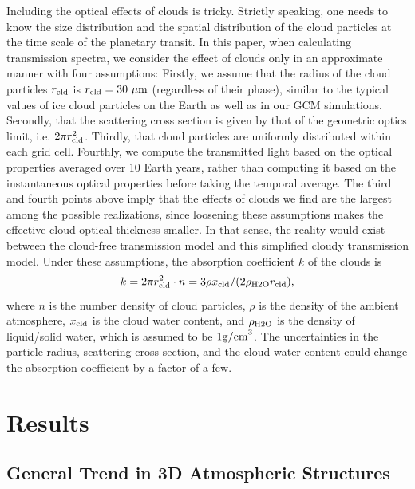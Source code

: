 \documentclass[11pt,numberedappendix,twocolappendix,]{emulateapj}
\begin{document}
Including the optical effects of clouds is tricky. 
Strictly speaking, one needs to know the size distribution and the spatial distribution of the cloud particles at the time scale of the planetary transit. 
In this paper, when calculating transmission spectra, we consider the effect of clouds only in an approximate manner with four assumptions:
%
Firstly, we assume that the radius of the cloud particles $r_{\rm cld}$ is $r_{\rm cld}=30~\mu {\rm m}$ (regardless of their phase), similar to the typical values of ice cloud particles on the Earth as well as in our GCM simulations.  
%
Secondly, that the scattering cross section is given by that of the geometric optics limit, i.e. $2 \pi r_{\rm cld}^2$. 
%
Thirdly, that cloud particles are uniformly distributed within each grid cell. 
%
Fourthly, we compute the transmitted light based on the optical properties averaged over 10 Earth years, rather than computing it based on the instantaneous optical properties before taking the temporal average. 
%
The third and fourth points above imply that the effects of clouds we find are the largest among the possible realizations, since loosening these assumptions makes the effective cloud optical thickness smaller. 
In that sense, the reality would exist between the cloud-free transmission model and this simplified cloudy transmission model. 
Under these assumptions, the absorption coefficient $k$ of the clouds is %
\begin{equation}
k = 2 \pi r_{\rm cld}^2 \cdot n = 3 \rho x_{\rm cld} / ( 2 \rho_{\rm H2O} r_{\rm cld} ),
\end{equation}
where $n$ is the number density of cloud particles, $\rho $ is the density of the ambient atmosphere, $x_{\rm cld}$ is the cloud water content, and $\rho_{\rm H2O}$ is the density of liquid/solid water, which is assumed to be $1 {\rm g/cm}^3$. 
The uncertainties in the particle radius, scattering cross section, and the cloud water content could change the absorption coefficient by a factor of a few. 


\section{Results}
\label{s:results}


\subsection{General Trend in 3D Atmospheric Structures}
\label{ss:result_H2Omixingratio}
\end{document}
